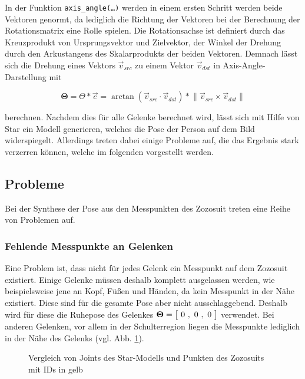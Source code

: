 In der Funktion \texttt{axis\_angle(\dots)} werden in einem ersten Schritt werden beide Vektoren genormt, da lediglich
die Richtung der Vektoren bei der Berechnung der Rotationsmatrix eine Rolle spielen. Die Rotationsachse
ist definiert durch das Kreuzprodukt von Ursprungsvektor und Zielvektor, der Winkel der Drehung durch den
Arkustangens des Skalarprodukts der beiden Vektoren. Demnach lässt sich die Drehung eines Vektors 
$\vec{v}_{src}$ zu einem Vektor $\vec{v}_{dst}$ in Axis-Angle-Darstellung mit

\begin{equation}\label{eq:axis_angle}
  \boldsymbol{\Theta} = \Theta * \vec{e} = \arctan(\vec{v}_{src} \cdot \vec{v}_{dst}) * \lVert \vec{v}_{src} \times \vec{v}_{dst} \rVert
\end{equation}

berechnen. Nachdem dies für alle Gelenke berechnet wird, lässt sich mit Hilfe von Star ein Modell generieren, welches
die Pose der Person auf dem Bild widerspiegelt. Allerdings treten dabei einige Probleme auf, die das Ergebnis
stark verzerren können, welche im folgenden vorgestellt werden.

\subsection{Probleme}
\label{subsec:probleme}
Bei der Synthese der Pose aus den Messpunkten des Zozosuit treten eine Reihe von Problemen auf.

\subsubsection*{Fehlende Messpunkte an Gelenken}
Eine Problem ist, dass nicht für jedes Gelenk ein Messpunkt auf dem Zozosuit existiert. Einige
Gelenke müssen deshalb komplett ausgelassen werden, wie beispielsweise jene an Kopf, Füßen und Händen, da kein Messpunkt in der
Nähe existiert. Diese sind für die gesamte Pose aber nicht ausschlaggebend. Deshalb wird für diese die Ruhepose des Gelenkes
$\boldsymbol{\Theta}=\irow{0 \ , \ 0 \ ,\ 0}$ verwendet. Bei anderen Gelenken, vor allem in der Schulterregion liegen die Messpunkte
lediglich in der Nähe des Gelenks (vgl. Abb. \ref{fig:schulter}).

\begin{figure}[H]
  \centering 
   \qquad 
  \caption{Vergleich von Joints des Star-Modells und Punkten des Zozosuits mit IDs in gelb} 
  \label{fig:schulter}
\end{figure}

